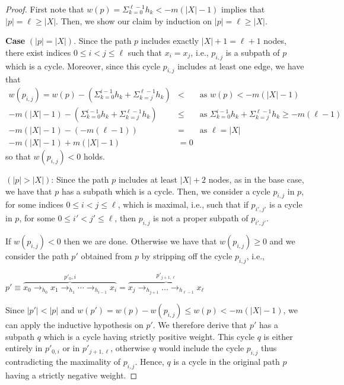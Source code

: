 \begin{proof}
  First note that \(w(p) = \Sigma_{k=0}^{\ell-1} h_k < -m(|X|-1)\)
  implies that \(|p|=\ell \geq |X|\).  Then, we show our claim by
  induction on \(|p|=\ell \geq |X|\).

  \noindent
  \textbf{Case} \((|p|=|X|)\).
  Since the path \(p\) includes exactly \(|X|+1=\ell+1\) nodes, there
  exist indices \(0\leq i < j\leq \ell\) such that \(x_i=x_j\), i.e.,
  \(p_{i,j}\) is a subpath of \(p\) which is a cycle. Moreover, since
  this cycle \(p_{i,j}\) includes at least one edge, we have that
  \begin{align*}
    w(p_{i,j}) = w(p) - (\Sigma_{k=0}^{i-1} h_k + \Sigma_{k=j}^{\ell-1}
    h_k) & < & \text{as \(w(p) < -m(|X|-1)\)}\\
    -m\left(|X|-1\right) - (\Sigma_{k=0}^{i-1} h_k + \Sigma_{k=j}^{\ell-1}
    h_k) & \leq & \text{as } \Sigma_{k=0}^{i-1} h_k + \Sigma_{k=j}^{\ell-1}
        h_k \geq -m(\ell-1) \\
    -m(|X|-1) - (-m (\ell-1)) &= & \text{as \(\ell=|X|\)}  \\  
    -m(|X|-1) + m(|X|-1) &= 0
  \end{align*}
  so that \(w(p_{i,j}) < 0\) holds. 

  \medskip
  \noindent

  \noindent
  \((|p|>|X|)\): Since the path \(p\) includes at least \(|X|+2\) nodes, as in
  the base case, we have that \(p\) has a subpath which is a cycle. Then, we consider a
  cycle \(p_{i,j}\) in \(p\), for some indices \(0\leq i < j\leq \ell\), which is maximal, i.e.,  such that
  if  \(p_{i',j'}\) is a cycle in \(p\),  for some 
  \(0\leq i' < j'\leq \ell\), then \(p_{i,j}\) is not a proper subpath of \(p_{i',j'}\).

  \medskip

  \noindent
  If \(w(p_{i,j}) < 0\) then we are done. Otherwise we have that
  \(w(p_{i,j}) \geq 0\) and we consider the path \(p'\) obtained from
  \(p\) by stripping off the cycle \(p_{i,j}\), i.e.,
  \begin{center}
    \(p' \equiv \overbrace{x_0 \to_{h_0} x_1 \to_{h_1} \cdots \to_{h_{i-1}} x_i}^{p'_0,i} =
    \overbrace{
      x_j\to_{h_{j+1}} \ldots \to_{h_{\ell-1}} x_{\ell}}^{p'_{j+1,\ell}}\)
  \end{center}
  Since \(|p'| < |p|\) and
  \(w(p')=w(p)-w(p_{i,j}) \leq w(p) < -m(|X|-1)\), we can apply the
  inductive hypothesis on \(p'\).  We therefore derive that \(p'\) has
  a subpath \(q\) which is a cycle having strictly positive
  weight. This cycle \(q\) is either entirely in \(p'_{0,i}\) or in
  \(p'_{j+1,\ell}\), otherwise \(q\) would include the cycle
  \(p_{i,j}\) thus contradicting the maximality of \(p_{i,j}\). Hence,
  \(q\) is a cycle in the original path \(p\) having a strictly
  negative weight.
\end{proof}


